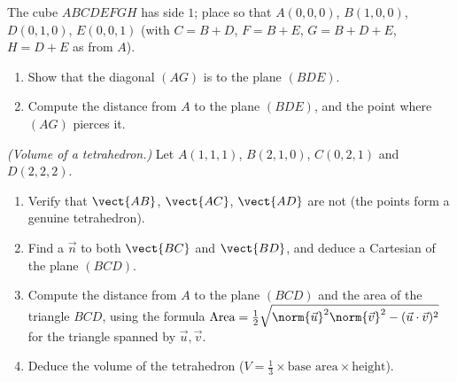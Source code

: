 \begin{exercise}[$\star\star\star$]\label{exo:g12:space:8}
The cube $ABCDEFGH$ has side $1$; place  so that
$A(0,0,0)$, $B(1,0,0)$, $D(0,1,0)$, $E(0,0,1)$ (with
$C = B + D$, $F = B + E$, $G = B + D + E$, $H = D + E$ as  from
$A$).
\begin{enumerate}
  \item Show that the diagonal $(AG)$ is  to the plane $(BDE)$.
  \item Compute the distance from $A$ to the plane $(BDE)$, and the point
        where $(AG)$ pierces it.
\end{enumerate}
\end{exercise}

\begin{exercise}[$\star\star\star$]\label{exo:g12:space:9}
\emph{(Volume of a tetrahedron.)} Let $A(1,1,1)$, $B(2,1,0)$, $C(0,2,1)$
and $D(2,2,2)$.
\begin{enumerate}
  \item Verify that $\vect{AB}$, $\vect{AC}$, $\vect{AD}$ are not 
        (the points form a genuine tetrahedron).
  \item Find a  $\vec n$  to both $\vect{BC}$ and
        $\vect{BD}$, and deduce a Cartesian  of the plane $(BCD)$.
  \item Compute the distance from $A$ to the plane $(BCD)$ and the area of
        the triangle $BCD$, using the formula
        $\text{Area} = \frac12\sqrt{\norm{\vec u}^2\norm{\vec v}^2 -
        (\vec u \cdot \vec v)^2}$ for the triangle spanned by
        $\vec u, \vec v$.
  \item Deduce the volume of the tetrahedron
        ($V = \frac13 \times \text{base area} \times \text{height}$).
\end{enumerate}
\end{exercise}
